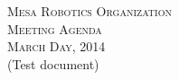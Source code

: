 \documentclass{article}
\begin{document}
\begin{center}
{\LARGE\scshape Mesa Robotics Organization}\\[0.2cm]
{\Large\scshape Meeting Agenda}\\[0.2cm]
{\Large\scshape March Day, 2014}\\[0.2cm]
{\large (Test document)}\\[0.2cm]
\end{center}
\vspace{0.4cm}
\end{document}
